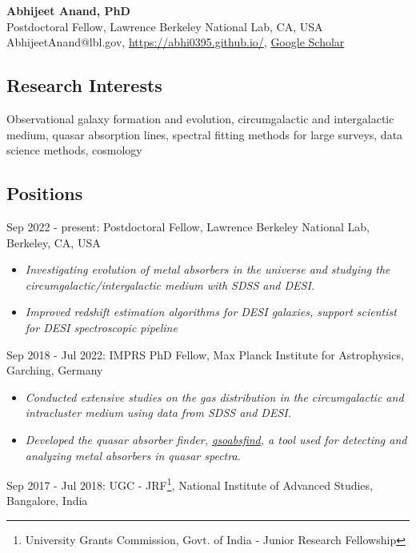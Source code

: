\documentclass[12pt,letterpaper]{article}
\begin{document}
\thispagestyle{empty}\sloppy\sloppypar\raggedbottom

\textbf{\Large Abhijeet Anand, PhD}\\[0.5ex]
Postdoctoral Fellow, Lawrence Berkeley National Lab, CA, USA\\[0.5ex]
\textsf{\small AbhijeetAnand@lbl.gov, \href{https://abhi0395.github.io/}{https://abhi0395.github.io/}, \href{https://scholar.google.com/citations?hl=en&user=MfOuq1IAAAAJ}{Google Scholar}}\\[0.5ex]

\subsection{Research Interests}
Observational galaxy formation and evolution, circumgalactic and intergalactic medium, quasar absorption lines, spectral fitting methods for large surveys, data science methods, cosmology

\subsection{Positions}
\begin{list}{}{\cvlist}
\item Sep 2022 - present: Postdoctoral Fellow, Lawrence Berkeley National Lab, Berkeley, CA, USA \\
\begin{itemize}
  \item \emph{Investigating evolution of metal absorbers in the universe and studying the circumgalactic/intergalactic medium with SDSS and DESI.}
  \item \emph{Improved redshift estimation algorithms for DESI galaxies, support scientist for DESI spectroscopic pipeline}
\end{itemize}
\item Sep 2018 - Jul 2022: IMPRS PhD Fellow, Max Planck Institute for Astrophysics, Garching, Germany
\begin{itemize}
\item \emph{Conducted extensive studies on the gas distribution in the circumgalactic and intracluster medium using data from SDSS and DESI.}
\item \emph{Developed the quasar absorber finder, \href{https://github.com/abhi0395/qsoabsfind}{qsoabsfind}, a tool used for detecting and analyzing metal absorbers in quasar spectra.}
\end{itemize}
\item Sep 2017 - Jul 2018: UGC - JRF\footnote{University Grants Commission, Govt. of India - Junior Research Fellowship}, National Institute of Advanced Studies, Bangalore, India
\end{list}
\end{document}
